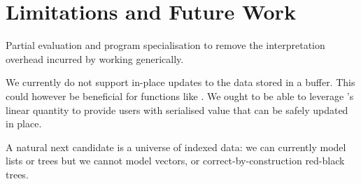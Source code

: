 \section{Limitations and Future Work}

Partial evaluation and program specialisation to remove the interpretation
overhead incurred by working generically.

We currently do not support in-place updates to the data stored in a buffer.
This could however be beneficial for functions like .
We ought to be able to leverage \idris{}'s linear quantity to provide users
with serialised value that can be safely updated in place.


A natural next candidate is a universe of indexed data: we can currently
model lists or trees but we cannot model vectors, or correct-by-construction
red-black trees.
